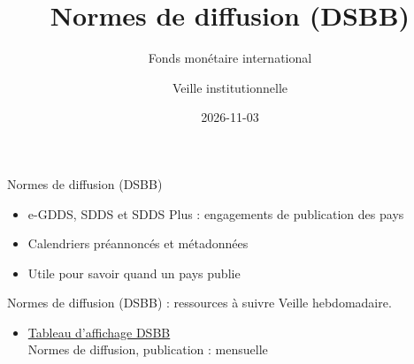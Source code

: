 \documentclass[aspectratio=169,11pt]{beamer}
\title{Normes de diffusion (DSBB)}
\subtitle{Fonds monétaire international}
\author{Veille institutionnelle}
\date{2026-11-03}
\begin{document}
\begin{frame}\titlepage\end{frame}

\begin{frame}{Normes de diffusion (DSBB)}
\begin{itemize}
\item e-GDDS, SDDS et SDDS Plus : engagements de publication des pays
\item Calendriers préannoncés et métadonnées
\item Utile pour savoir quand un pays publie
\end{itemize}
\end{frame}

\begin{frame}{Normes de diffusion (DSBB) : ressources à suivre}
\small
Veille hebdomadaire.
\begin{itemize}
\item \href{https://dsbb.imf.org}{Tableau d'affichage DSBB}\\{\footnotesize Normes de diffusion, publication : mensuelle}
\end{itemize}
\end{frame}
\end{document}
